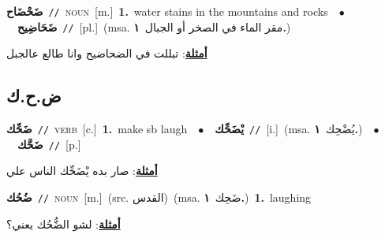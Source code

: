 \documentclass[10pt,a4paper,twoside]{article} %
\begin{document}
\begin{multicols}{2}
{{{{{\setlength\topsep{0pt}\textbf{\foreignlanguage{arabic}{ضَحْضَاح}}\ {\color{gray}\texttt{//}\color{black}}\ \textsc{noun}\ [m.]\ \textbf{1.}~water stains in the mountains and rocks\ \ $\bullet$\ \ \setlength\topsep{0pt}\textbf{\foreignlanguage{arabic}{ضَحَاضِيح}}\ {\color{gray}\texttt{//}\color{black}}\ [pl.]\ \color{gray}(msa. \foreignlanguage{arabic}{مقر الماء في الصخر أو الجبال}~\foreignlanguage{arabic}{\textbf{١.}})\color{black}\  \begin{flushright}\color{gray}\foreignlanguage{arabic}{\textbf{\underline{\foreignlanguage{arabic}{أمثلة}}}: تبللت في الضحاضيح وانا طالع عالجبل}\end{flushright}\color{black}} \vspace{2mm}

\vspace{-3mm}
\subsection*{\color{blue}\foreignlanguage{arabic}{ض.ح.ك}\color{blue}{}} 

{\setlength\topsep{0pt}\textbf{\foreignlanguage{arabic}{ضَحِّك}}\ {\color{gray}\texttt{//}\color{black}}\ \textsc{verb}\ [c.]\ \textbf{1.}~make sb laugh\ \ $\bullet$\ \ \setlength\topsep{0pt}\textbf{\foreignlanguage{arabic}{يْضَحِّك}}\ {\color{gray}\texttt{//}\color{black}}\ [i.]\ \color{gray}(msa. \foreignlanguage{arabic}{يُضْحِك}~\foreignlanguage{arabic}{\textbf{١.}})\color{black}\ \ $\bullet$\ \ \setlength\topsep{0pt}\textbf{\foreignlanguage{arabic}{ضَحَّك}}\ {\color{gray}\texttt{//}\color{black}}\ [p.]\  \begin{flushright}\color{gray}\foreignlanguage{arabic}{\textbf{\underline{\foreignlanguage{arabic}{أمثلة}}}: صار بده يْضَحِّك الناس علي}\end{flushright}\color{black}} \vspace{2mm}

{\setlength\topsep{0pt}\textbf{\foreignlanguage{arabic}{ضُحُك}}\ {\color{gray}\texttt{//}\color{black}}\ \textsc{noun}\ [m.]\ (src. \color{gray}\foreignlanguage{arabic}{القدس}\color{black})\ \color{gray}(msa. \foreignlanguage{arabic}{ضَحِك}~\foreignlanguage{arabic}{\textbf{١.}})\color{black}\ \textbf{1.}~laughing\  \begin{flushright}\color{gray}\foreignlanguage{arabic}{\textbf{\underline{\foreignlanguage{arabic}{أمثلة}}}: لشو الضُّحُك يعني؟}\end{flushright}\color{black}} \vspace{2mm}

}}}}
\end{multicols}
\end{document}
